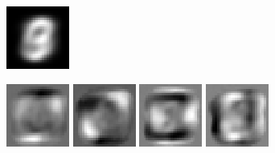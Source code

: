 \documentclass{revtex4-1}
\begin{document}
\begin{figure}
\begin{subfigure}{.3\linewidth}
    \caption{}
    \label{fig:vbias}
  \end{subfigure}
  \begin{subfigure}{.3\linewidth}
    \includegraphics[width=\linewidth]{X_l_eigv_1.eps}
    \caption{}
    \label{fig:m1data}
  \end{subfigure}\par\medskip
  \begin{subfigure}{\linewidth}
    \includegraphics[width=.1\linewidth]{W_l_eigv_2.eps}
    \includegraphics[width=.1\linewidth]{W_l_eigv_3.eps}
    \includegraphics[width=.1\linewidth]{W_l_eigv_4.eps}
    \includegraphics[width=.1\linewidth]{W_l_eigv_5.eps}

\end{subfigure}
\end{figure}
\end{document}

